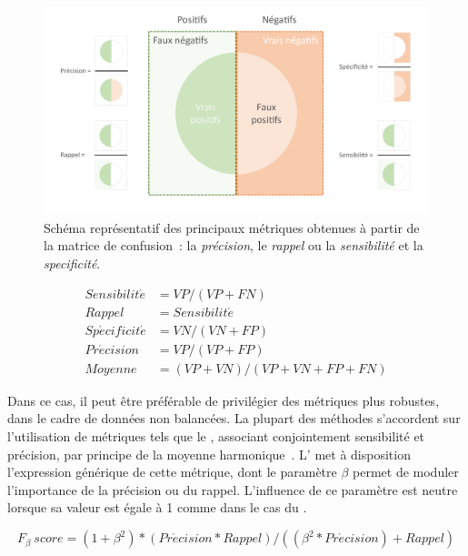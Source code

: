 \begin{figure}[H]
    \centering
    \includegraphics[width=\linewidth]{contents/chapter_3/resources/scheme_confusion_metrics.pdf}
    \caption{Schéma représentatif des principaux métriques obtenues à partir de la matrice de confusion~: la \textit{précision}, le \textit{rappel} ou la \textit{sensibilité} et la \textit{specificité}.}
    \label{fig:scheme_confusion_metrics}
\end{figure}

\begin{equation} 
    \label{eq:metrics_basics}
    \begin{split}
    Sensibilit\acute{e} &= VP/(VP+FN) \\
    Rappel &= Sensibilit\acute{e} \\	
    Sp\acute{e}cificit\acute{e} &=  VN/(VN+FP) \\
    Pr\acute{e}cision &= VP/(VP+FP) \\
    Moyenne &= (VP+VN)/(VP+VN+FP+FN)
    \end{split}
\end{equation}

Dans ce cas, il peut être préférable de privilégier des métriques plus robustes, dans le cadre de données non balancées. La plupart des méthodes s’accordent sur l’utilisation de métriques tels que le \fscore{}, associant conjointement sensibilité et précision, par principe de la moyenne harmonique~\cite{Guo2008}. L' met à disposition l'expression générique de cette métrique, dont le paramètre $\beta$ permet de moduler l'importance de la précision ou du rappel. L'influence de ce paramètre est neutre lorsque sa valeur est égale à 1 comme dans le cas du \fscore.\par
 
\begin{equation} 
    {F_\beta \: score}=(1+\beta^2)*(Pr\acute{e}cision*Rappel)/((\beta^2*Pr\acute{e}cision)+Rappel)
    \label{eq:metrics_fscore}
\end{equation}
 
